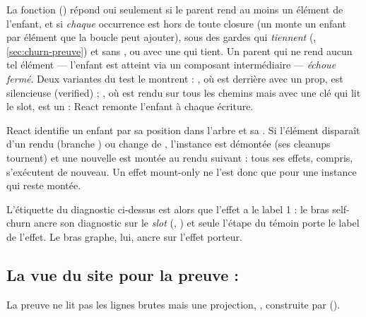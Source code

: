 La fonction  () répond
\og oui\fg{} seulement si le parent rend au moins un élément de l'enfant, et si
\emph{chaque} occurrence est hors de toute closure (un 
monte un enfant par élément que la boucle peut ajouter), sous des gardes qui \emph{tiennent}
(, \cref{sec:churn-preuve}) et sans , ou avec une
 qui tient. Un parent qui ne rend aucun tel élément --- l'enfant est atteint via
un composant intermédiaire --- \emph{échoue fermé}. Deux variantes du test le montrent :
, où  est derrière 
avec  un prop, est silencieuse (\og verified\fg) ; , où
 est rendu sur tous les chemins mais avec une clé qui
lit le slot, est un \Warning{} : React remonte l'enfant à chaque écriture.

\begin{react}
React identifie un enfant par sa position dans l'arbre et sa . Si l'élément
disparaît d'un rendu (branche ) ou change de , l'instance est démontée
(ses cleanups tournent) et une nouvelle est montée au rendu suivant : tous ses effets,
\code{[]} compris, s'exécutent de nouveau. Un effet \og mount-only\fg{} ne l'est donc que
pour une instance qui reste montée.
\end{react}

\begin{piege}
L'étiquette du diagnostic ci-dessus est \code{[hook:0]} alors que l'effet a le label 1 :
le bras self-churn ancre son diagnostic sur le \emph{slot} (,
) et seule l'étape  du témoin
porte le label de l'effet. Le bras graphe, lui, ancre sur l'effet porteur.
\end{piege}

\subsection{La vue du site pour la preuve : }

La preuve ne lit pas les lignes brutes mais une projection, , construite par
 ().


